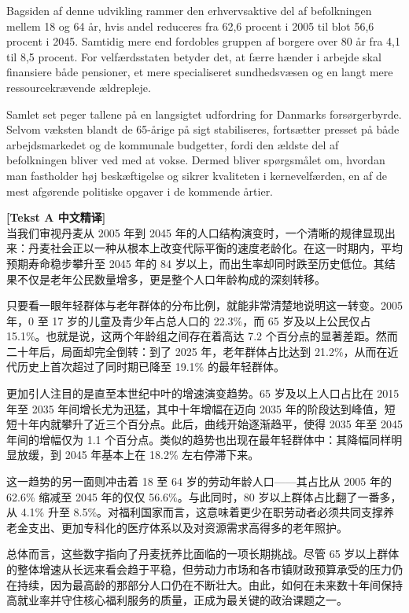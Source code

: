 Bagsiden af denne udvikling rammer den erhvervsaktive del af befolkningen mellem 18 og 64 år, hvis andel reduceres fra 62,6 procent i 2005 til blot 56,6 procent i 2045. Samtidig mere end fordobles gruppen af borgere over 80 år fra 4,1 til 8,5 procent. For velfærdsstaten betyder det, at færre hænder i arbejde skal finansiere både pensioner, et mere specialiseret sundhedsvæsen og en langt mere ressourcekrævende ældrepleje.

Samlet set peger tallene på en langsigtet udfordring for Danmarks forsørgerbyrde. Selvom væksten blandt de 65-årige på sigt stabiliseres, fortsætter presset på både arbejdsmarkedet og de kommunale budgetter, fordi den ældste del af befolkningen bliver ved med at vokse. Dermed bliver spørgsmålet om, hvordan man fastholder høj beskæftigelse og sikrer kvaliteten i kernevelfærden, en af de mest afgørende politiske opgaver i de kommende årtier.

\begin{transbox}
\small
\textbf{\color{NCDTeal}[Tekst A 中文精译]}\\
当我们审视丹麦从 2005 年到 2045 年的人口结构演变时，一个清晰的规律显现出来：丹麦社会正以一种从根本上改变代际平衡的速度老龄化。在这一时期内，平均预期寿命稳步攀升至 2045 年的 84 岁以上，而出生率却同时跌至历史低位。其结果不仅是老年公民数量增多，更是整个人口年龄构成的深刻转移。

只要看一眼年轻群体与老年群体的分布比例，就能非常清楚地说明这一转变。2005 年，0 至 17 岁的儿童及青少年占总人口的 22.3\%，而 65 岁及以上公民仅占 15.1\%。也就是说，这两个年龄组之间存在着高达 7.2 个百分点的显著差距。然而二十年后，局面却完全倒转：到了 2025 年，老年群体占比达到 21.2\%，从而在近代历史上首次超过了同时期已降至 19.1\% 的最年轻群体。

更加引人注目的是直至本世纪中叶的增速演变趋势。65 岁及以上人口占比在 2015 年至 2035 年间增长尤为迅猛，其中十年增幅在迈向 2035 年的阶段达到峰值，短短十年内就攀升了近三个百分点。此后，曲线开始逐渐趋平，使得 2035 年至 2045 年间的增幅仅为 1.1 个百分点。类似的趋势也出现在最年轻群体中：其降幅同样明显放缓，到 2045 年基本上在 18.2\% 左右停滞下来。

这一趋势的另一面则冲击着 18 至 64 岁的劳动年龄人口——其占比从 2005 年的 62.6\% 缩减至 2045 年的仅仅 56.6\%。与此同时，80 岁以上群体占比翻了一番多，从 4.1\% 升至 8.5\%。对福利国家而言，这意味着更少在职劳动者必须共同支撑养老金支出、更加专科化的医疗体系以及对资源需求高得多的老年照护。

总体而言，这些数字指向了丹麦抚养比面临的一项长期挑战。尽管 65 岁以上群体的整体增速从长远来看会趋于平稳，但劳动力市场和各市镇财政预算承受的压力仍在持续，因为最高龄的那部分人口仍在不断壮大。由此，如何在未来数十年间保持高就业率并守住核心福利服务的质量，正成为最关键的政治课题之一。
\end{transbox}


